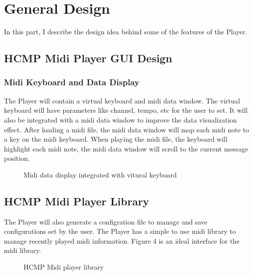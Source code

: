\documentclass[12pt]{article} %
\begin{document}

\section{General Design} %

In this part, I describe the design idea behind some of the features of the Player. 

\subsection{HCMP Midi Player GUI Design} %

\subsubsection{Midi Keyboard and Data Display} %
The Player will contain a virtual keyboard and midi data window. The 
virtual keyboard will have parameters like channel, tempo, etc for the user to set. 
It will also be integrated with a midi data window to improve the data visualization
effect. After loading a midi file, the midi data window will map each midi note to a key on the midi keyboard. 
When playing the midi file, the keyboard will highlight each midi note, the midi data window
will scroll to the current message position.

\begin{figure}[H] %
\caption{Midi data display integrated with vitural keyboard}
\label{fig:speciation}
\end{figure}

\subsection{HCMP Midi Player Library}
The Player will also generate a configration file to manage and 
save configurations set by the user. The Player has a simple to  
use midi library to manage recently played midi information. Figure 4 is an ideal interface
for the midi library.
\begin{figure}[H] %
\caption{HCMP Midi player library}
\label{fig:speciation}
\end{figure}
\end{document}
